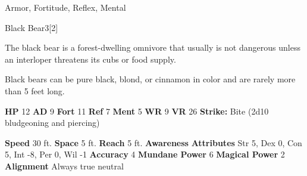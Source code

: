     
     Armor,
     Fortitude,
     Reflex,
     Mental
  
  
      
  \begin{monsection}{Black Bear}{3}[2]
    \vspace{-1em}\vspace{-1em}
    \vspace{0em}

    
      The black bear is a forest-dwelling omnivore that usually is not dangerous unless an interloper threatens its cubs or food supply.

      Black bears can be pure black, blond, or cinnamon in color and are rarely more than 5 feet long.
    
    

    \begin{spellcontent}
      \begin{spelltargetinginfo}
        \pari \textbf{HP} 12 \monsep
          \textbf{AD} 9 \monsep
          \textbf{Fort} 11 \monsep
          \textbf{Ref} 7 \monsep
          \textbf{Ment} 5
        \pari \textbf{WR} 9 \monsep
        \textbf{VR} 26
        \pari \textbf{Strike:}
            Bite  (2d10 bludgeoning and piercing)
      \end{spelltargetinginfo}
    \end{spellcontent}
    \begin{monsterfooter}
      \pari \textbf{Speed} 30 ft. \monsep
        \textbf{Space} 5 ft. \monsep
        \textbf{Reach} 5 ft.
      \pari \textbf{Awareness} 
      \pari \textbf{Attributes}
        Str 5, Dex 0,
        Con 5, Int -8,
        Per 0, Wil -1
      \pari \textbf{Accuracy} 4 \monsep
        \textbf{Mundane Power} 6 \monsep
      \textbf{Magical Power} 2
      \pari \textbf{Alignment} Always true neutral
    \end{monsterfooter}
  \end{monsection}
  
